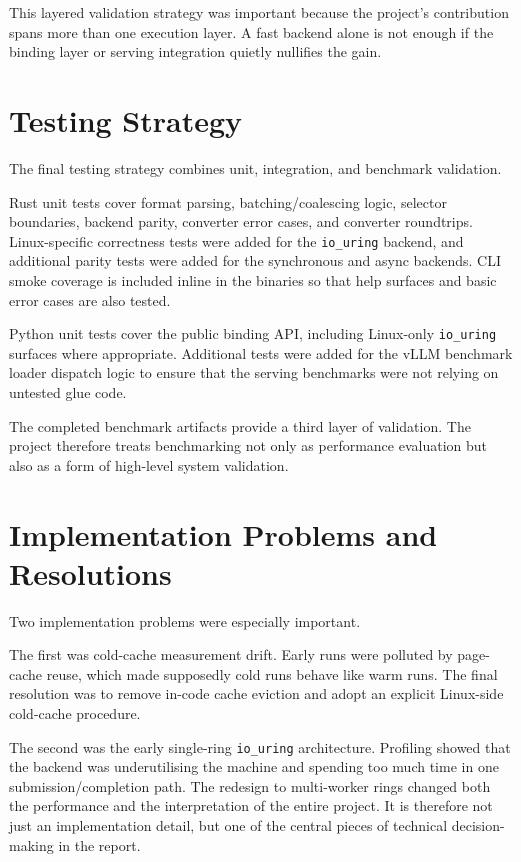This layered validation strategy was important because the project's contribution spans more than one execution layer. A fast backend alone is not enough if the binding layer or serving integration quietly nullifies the gain.

\section{Testing Strategy}

The final testing strategy combines unit, integration, and benchmark validation.

Rust unit tests cover format parsing, batching/coalescing logic, selector boundaries, backend parity, converter error cases, and converter roundtrips. Linux-specific correctness tests were added for the \texttt{io\_uring} backend, and additional parity tests were added for the synchronous and async backends. CLI smoke coverage is included inline in the binaries so that help surfaces and basic error cases are also tested.

Python unit tests cover the public binding API, including Linux-only \texttt{io\_uring} surfaces where appropriate. Additional tests were added for the vLLM benchmark loader dispatch logic to ensure that the serving benchmarks were not relying on untested glue code.

The completed benchmark artifacts provide a third layer of validation. The project therefore treats benchmarking not only as performance evaluation but also as a form of high-level system validation.

\section{Implementation Problems and Resolutions}

Two implementation problems were especially important.

The first was cold-cache measurement drift. Early runs were polluted by page-cache reuse, which made supposedly cold runs behave like warm runs. The final resolution was to remove in-code cache eviction and adopt an explicit Linux-side cold-cache procedure.

The second was the early single-ring \texttt{io\_uring} architecture. Profiling showed that the backend was underutilising the machine and spending too much time in one submission/completion path. The redesign to multi-worker rings changed both the performance and the interpretation of the entire project. It is therefore not just an implementation detail, but one of the central pieces of technical decision-making in the report.

